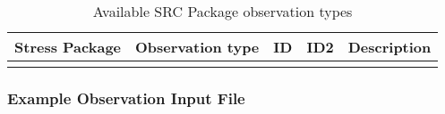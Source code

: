 \begin{longtable}{p{2cm} p{2.75cm} p{2cm} p{1.25cm} p{7cm}}
\caption{Available SRC Package observation types} \tabularnewline

\hline
\hline
\textbf{Stress Package} & \textbf{Observation type} & \textbf{ID} & \textbf{ID2} & \textbf{Description} \\
\hline
\endhead

\hline
\endfoot


\label{table:gwt-srcobstype}
\end{longtable}

\vspace{5mm}
\subsubsection{Example Observation Input File}

